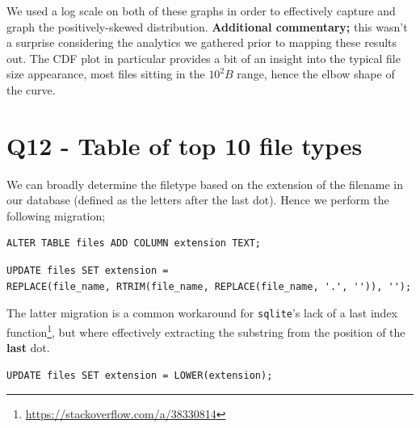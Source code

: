 \documentclass{article}
\begin{document}
We used a log scale on both of these graphs in order to effectively capture and graph the positively-skewed distribution. \textbf{Additional commentary;} this wasn't a surprise considering the analytics we gathered prior to mapping these results out. The CDF plot in particular provides a bit of an insight into the typical file size appearance, most files sitting in the $10^2B$ range, hence the elbow shape of the curve.

\section*{Q12 - Table of top 10 file types}
We can broadly determine the filetype based on the extension of the filename in our database (defined as the letters after the last dot). Hence we perform the following migration;

\begin{small}
\begin{verbatim}
ALTER TABLE files ADD COLUMN extension TEXT;
\end{verbatim}
\end{small}

\begin{small}
\begin{verbatim}
UPDATE files SET extension = 
REPLACE(file_name, RTRIM(file_name, REPLACE(file_name, '.', '')), '');
\end{verbatim}
\end{small}

The latter migration is a common workaround for \texttt{sqlite}'s lack of a last index function\footnote{\url{https://stackoverflow.com/a/38330814}}, but where effectively extracting the substring from the position of the \textbf{last} dot.

\begin{small}
\begin{verbatim}
UPDATE files SET extension = LOWER(extension);
\end{verbatim}
\end{small}

\newpage
\end{document}
